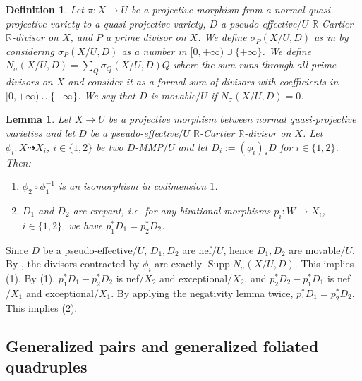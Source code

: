 \documentclass[preprint,12pt]{elsarticle}
\newcommand{\Rr}{\mathbb{R}}
\newcommand{\Supp}{\operatorname{Supp}}
\newtheorem{lem}[thm]{Lemma}
\newtheorem{defn}[thm]{Definition}
\begin{document}
\begin{defn}
    Let $\pi: X\rightarrow U$ be a projective morphism from a normal quasi-projective variety to a quasi-projective variety, $D$ a pseudo-effective$/U$ $\Rr$-Cartier $\Rr$-divisor on $X$, and $P$ a prime divisor on $X$. We define $\sigma_{P}(X/U,D)$ as in \cite[Definition 3.1]{LX23a} by considering $\sigma_{P}(X/U,D)$ as a number in  $[0,+\infty)\cup\{+\infty\}$. We define $N_{\sigma}(X/U,D)=\sum_Q\sigma_Q(X/U,D)Q$
    where the sum runs through all prime divisors on $X$ and consider it as a formal sum of divisors with coefficients in $[0,+\infty)\cup\{+\infty\}$. We say that $D$ is \emph{movable$/U$} if $N_{\sigma}(X/U,D)=0$.
\end{defn}

\begin{lem}\label{lem: output of MMP isomorphic in codimension 1}
  Let $X\rightarrow U$ be a projective morphism between normal quasi-projective varieties and let $D$ be a pseudo-effective$/U$ $\Rr$-Cartier $\Rr$-divisor on $X$. Let $\phi_i: X\dashrightarrow X_i$, $i\in\{1,2\}$ be two $D$-MMP$/U$ and let $D_i:=(\phi_i)_*D$ for $i\in\{1,2\}$. Then:
  \begin{enumerate}
      \item $\phi_2\circ\phi^{-1}_1$ is an isomorphism in codimension $1$.
      \item $D_1$ and $D_2$ are crepant, i.e. for any birational morphisms $p_i: W\rightarrow X_i$, $i\in\{1,2\}$, we have $p_1^*D_1=p_2^*D_2$.
  \end{enumerate}
\end{lem}
\begin{pf}
Since $D$ be a pseudo-effective$/U$, $D_1,D_2$ are nef$/U$, hence $D_1,D_2$ are movable$/U$. By \cite[Lemma 2.25]{LMX24b}, the divisors contracted by $\phi_i$ are exactly $\Supp N_{\sigma}(X/U,D)$. This implies (1). By (1), $p_1^*D_1-p_2^*D_2$ is nef$/X_2$ and exceptional$/X_2$, and $p_2^*D_2-p_1^*D_1$ is nef$/X_1$ and exceptional$/X_1$. By applying the negativity lemma twice, $p_1^*D_1=p_2^*D_2$. This implies (2).
\end{pf}

\subsection{Generalized pairs and generalized foliated quadruples}
\end{document}
